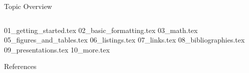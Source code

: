 



\begin{frame}[plain]{Topic Overview}
\begin{columns}[c,onlytextwidth]
\tableofcontents[sections={1-5}]
\tableofcontents[sections={6-10}]
\end{columns}
\end{frame}

{01_getting_started.tex}
{02_basic_formatting.tex}
{03_math.tex}
{05_figures_and_tables.tex}
{06_listings.tex}
{07_links.tex}
{08_bibliographies.tex}
{09_presentations.tex}
{10_more.tex}

\appendix
\beginbackup

\begin{frame}[allowframebreaks]{References}
\printbibliography
\end{frame}

\backupend


